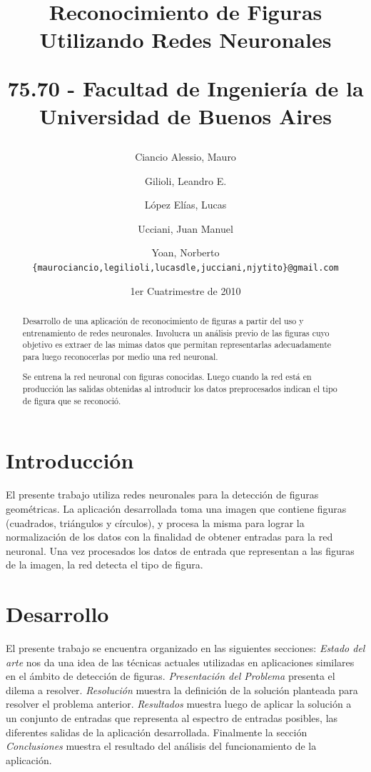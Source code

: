 \documentclass[pdftex,a4paper,10.5pt]{article}
\title{\textbf{Reconocimiento de Figuras Utilizando Redes Neuronales }\\
\begin{normalsize}75.70 - Facultad de Ingenier\'ia de la Universidad de Buenos Aires\end{normalsize} }
\author{
	Ciancio Alessio, Mauro \and
	Gilioli, Leandro E. \and
	L\'opez El\'ias, Lucas \and
	Ucciani, Juan Manuel \and
	Yoan, Norberto \\
	\texttt{\{maurociancio,legilioli,lucasdle,jucciani,njytito\}@gmail.com}
	}
\date{1er Cuatrimestre de 2010}
\begin{document}
\maketitle

\begin{abstract}
	Desarrollo de una aplicaci\'on de reconocimiento de figuras a partir del uso y entrenamiento de redes neuronales. Involucra un an\'alisis previo de las figuras cuyo objetivo es extraer de las mimas datos que permitan representarlas adecuadamente para luego reconocerlas por medio una red neuronal.
	
	Se entrena la red neuronal con figuras conocidas. Luego cuando la red est\'a en producci\'on las salidas obtenidas al introducir los datos preprocesados indican el tipo de figura que se reconoci\'o.
\end{abstract}

\thispagestyle{empty}

\section{Introducci\'on}
El presente trabajo utiliza redes neuronales para la detecci\'on de figuras geom\'etricas. 
La aplicaci\'on desarrollada toma una imagen que contiene figuras (cuadrados, tri\'angulos y c\'irculos), y procesa la misma para lograr la normalizaci\'on de los datos con la finalidad de obtener entradas para la red neuronal. 
Una vez procesados los datos de entrada que representan a las figuras de la imagen, la red detecta el tipo de figura.


\section{Desarrollo}
El presente trabajo se encuentra organizado en las siguientes secciones:
\textit{Estado del arte} nos da una idea de las t\'ecnicas actuales utilizadas en aplicaciones similares en el ámbito de detecci\'on de figuras. 
\textit{Presentaci\'on del Problema} presenta el dilema a resolver.
\textit{Resoluci\'on} muestra la definici\'on de la soluci\'on planteada para resolver el problema anterior. 
\textit{Resultados} muestra luego de aplicar la soluci\'on a un conjunto de entradas que representa al espectro de entradas posibles, las diferentes salidas de la aplicaci\'on desarrollada.
Finalmente la secci\'on \textit{Conclusiones} muestra el resultado del an\'alisis del funcionamiento de la aplicaci\'on.
\end{document}
